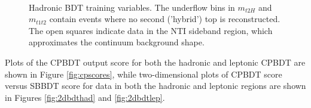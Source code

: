 \begin{figure}[htbp]
	\\
  \caption{Hadronic BDT training variables. The underflow bins in $m_{t2H}$ and $m_{t1t2}$ contain events where no second ('hybrid') top is reconstructed. The open squares indicate data in the NTI sideband region, which approximates the continuum background shape. }  	
  \label{fig:hadvbls2}
\end{figure}

Plots of the CPBDT output score for both the hadronic and leptonic CPBDT are shown in Figure \ref{fig:cpscores}, while two-dimensional plots of CPBDT score versus SBBDT score for data in both the hadronic and leptonic regions are shown in Figures \ref{fig:2dbdthad} and \ref{fig:2dbdtlep}.

